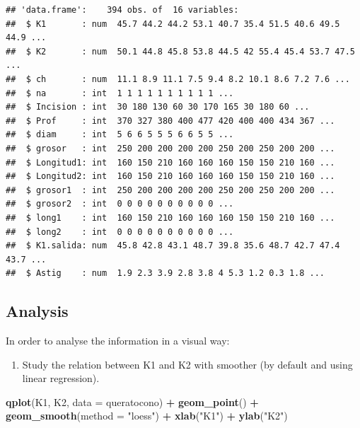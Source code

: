 \documentclass[
]{article}
\newenvironment{Shaded}{\begin{snugshade}}{\end{snugshade}}
\newcommand{\DataTypeTok}[1]{\textcolor[rgb]{0.13,0.29,0.53}{#1}}
\newcommand{\KeywordTok}[1]{\textcolor[rgb]{0.13,0.29,0.53}{\textbf{#1}}}
\newcommand{\NormalTok}[1]{#1}
\newcommand{\OperatorTok}[1]{\textcolor[rgb]{0.81,0.36,0.00}{\textbf{#1}}}
\newcommand{\StringTok}[1]{\textcolor[rgb]{0.31,0.60,0.02}{#1}}
\providecommand{\tightlist}{%
  \setlength{\itemsep}{0pt}\setlength{\parskip}{0pt}}
\begin{document}
\begin{verbatim}
## 'data.frame':    394 obs. of  16 variables:
##  $ K1       : num  45.7 44.2 44.2 53.1 40.7 35.4 51.5 40.6 49.5 44.9 ...
##  $ K2       : num  50.1 44.8 45.8 53.8 44.5 42 55.4 45.4 53.7 47.5 ...
##  $ ch       : num  11.1 8.9 11.1 7.5 9.4 8.2 10.1 8.6 7.2 7.6 ...
##  $ na       : int  1 1 1 1 1 1 1 1 1 1 ...
##  $ Incision : int  30 180 130 60 30 170 165 30 180 60 ...
##  $ Prof     : int  370 327 380 400 477 420 400 400 434 367 ...
##  $ diam     : int  5 6 6 5 5 5 6 6 5 5 ...
##  $ grosor   : int  250 200 200 200 200 250 200 250 200 200 ...
##  $ Longitud1: int  160 150 210 160 160 160 150 150 210 160 ...
##  $ Longitud2: int  160 150 210 160 160 160 150 150 210 160 ...
##  $ grosor1  : int  250 200 200 200 200 250 200 250 200 200 ...
##  $ grosor2  : int  0 0 0 0 0 0 0 0 0 0 ...
##  $ long1    : int  160 150 210 160 160 160 150 150 210 160 ...
##  $ long2    : int  0 0 0 0 0 0 0 0 0 0 ...
##  $ K1.salida: num  45.8 42.8 43.1 48.7 39.8 35.6 48.7 42.7 47.4 43.7 ...
##  $ Astig    : num  1.9 2.3 3.9 2.8 3.8 4 5.3 1.2 0.3 1.8 ...
\end{verbatim}

\hypertarget{analysis}{%
\subsection{Analysis}\label{analysis}}

In order to analyse the information in a visual way:

\begin{enumerate}
\def\labelenumi{\arabic{enumi}.}
\tightlist
\item
  Study the relation between K1 and K2 with smoother (by default and
  using linear regression).
\end{enumerate}

\begin{Shaded}
\begin{Highlighting}[]
\KeywordTok{qplot}\NormalTok{(K1, K2, }\DataTypeTok{data =}\NormalTok{ queratocono) }\OperatorTok{+}
\StringTok{  }\KeywordTok{geom_point}\NormalTok{() }\OperatorTok{+}\StringTok{ }
\StringTok{  }\KeywordTok{geom_smooth}\NormalTok{(}\DataTypeTok{method =} \StringTok{"loess"}\NormalTok{) }\OperatorTok{+}
\StringTok{  }\KeywordTok{xlab}\NormalTok{(}\StringTok{"K1"}\NormalTok{) }\OperatorTok{+}\StringTok{ }\KeywordTok{ylab}\NormalTok{(}\StringTok{"K2"}\NormalTok{)}
\end{Highlighting}
\end{Shaded}
\end{document}
